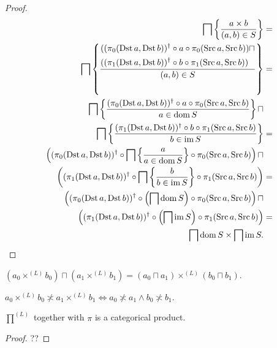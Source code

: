 \begin{proof}
  ~
  \begin{align*}
  \bigsqcap \left\{ \frac{ a \times b }{ (a , b) \in S }\right\} & = \\
  \bigsqcap \left\{ \frac{ \begin{aligned}&((\pi_0(\operatorname{Dst} a , \operatorname{Dst}
  b))^{\dagger} \circ a \circ \pi_0(\operatorname{Src} a , \operatorname{Src} b)) \sqcap\\
  &((\pi_1(\operatorname{Dst} a , \operatorname{Dst} b))^{\dagger} \circ b \circ
  \pi_1(\operatorname{Src} a , \operatorname{Src} b))\end{aligned} }{ (a , b) \in S }\right\} & = \\
  \bigsqcap \left\{ \frac{ (\pi_0(\operatorname{Dst} a , \operatorname{Dst}
  b))^{\dagger} \circ a \circ \pi_0(\operatorname{Src} a , \operatorname{Src} b)
  }{ a \in \operatorname{dom} S }\right\} \sqcap\\
  \bigsqcap
  \left\{ \frac{ (\pi_1(\operatorname{Dst} a , \operatorname{Dst} b))^{\dagger} \circ b \circ
  \pi_1(\operatorname{Src} a , \operatorname{Src} b) }{ b \in \operatorname{im} S }\right\} & = \\
  \left( (\pi_0(\operatorname{Dst} a , \operatorname{Dst}
  b))^{\dagger} \circ \bigsqcap \left\{ \frac{ a }{ a \in
  \operatorname{dom} S }\right\} \circ \pi_0(\operatorname{Src} a , \operatorname{Src} b) \right)
  \sqcap\\ \left( (\pi_1(\operatorname{Dst} a , \operatorname{Dst} b))^{\dagger} \circ
  \bigsqcap \left\{ \frac{ b }{ b \in \operatorname{im} S }\right\}
  \circ \pi_1(\operatorname{Src} a , \operatorname{Src} b) \right) & = \\
  \left(
  (\pi_0(\operatorname{Dst} a , \operatorname{Dst} b))^{\dagger} \circ \left( \bigsqcap
  \operatorname{dom} S \right) \circ \pi_0(\operatorname{Src} a , \operatorname{Src} b) \right)
  \sqcap\\ \left( (\pi_1(\operatorname{Dst} a , \operatorname{Dst} b))^{\dagger} \circ \left(
  \bigsqcap \operatorname{im} S \right) \circ \pi_1(\operatorname{Src} a , \operatorname{Src} b)
  \right) & = \\
  \bigsqcap \operatorname{dom} S \times \bigsqcap \operatorname{im} S.
  \end{align*}
\end{proof}

\begin{cor}
  $(a_0 \times^{(L)} b_0) \sqcap (a_1 \times^{(L)} b_1) = (a_0 \sqcap a_1)
  \times^{(L)} (b_0 \sqcap b_1)$.
\end{cor}

\begin{cor}
  $a_0 \times^{(L)} b_0 \nasymp a_1 \times^{(L)} b_1 \Leftrightarrow a_0
  \nasymp a_1 \wedge b_0 \nasymp b_1$.
\end{cor}

\begin{thm}
$\prod^{(L)}$ together with $\pi$ is a categorical product.
\end{thm}

\begin{proof}
??
\end{proof}

